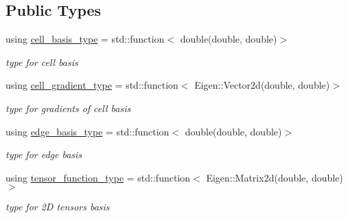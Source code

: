 \subsection*{Public Types}
\begin{DoxyCompactItemize}
\item 
\mbox{\label{classHCore2D_1_1HybridCore_a0111ea462b9a3b9859e1582b4bdaf63f}} 
using \hyperlink{classHCore2D_1_1HybridCore_a0111ea462b9a3b9859e1582b4bdaf63f}{cell\+\_\+basis\+\_\+type} = std\+::function$<$ double(double, double)$>$
\begin{DoxyCompactList}\small\item\em type for cell basis \end{DoxyCompactList}\item 
\mbox{\label{classHCore2D_1_1HybridCore_ae6a6ebafdb90354417d0068dd75134cd}} 
using \hyperlink{classHCore2D_1_1HybridCore_ae6a6ebafdb90354417d0068dd75134cd}{cell\+\_\+gradient\+\_\+type} = std\+::function$<$ Eigen\+::\+Vector2d(double, double)$>$
\begin{DoxyCompactList}\small\item\em type for gradients of cell basis \end{DoxyCompactList}\item 
\mbox{\label{classHCore2D_1_1HybridCore_ad3bb126480b53a54fa7eebbcbaa1dd4c}} 
using \hyperlink{classHCore2D_1_1HybridCore_ad3bb126480b53a54fa7eebbcbaa1dd4c}{edge\+\_\+basis\+\_\+type} = std\+::function$<$ double(double, double)$>$
\begin{DoxyCompactList}\small\item\em type for edge basis \end{DoxyCompactList}\item 
\mbox{\label{classHCore2D_1_1HybridCore_acf40d06e50a33dbb42cc4e1e3b0529b5}} 
using \hyperlink{classHCore2D_1_1HybridCore_acf40d06e50a33dbb42cc4e1e3b0529b5}{tensor\+\_\+function\+\_\+type} = std\+::function$<$ Eigen\+::\+Matrix2d(double, double)$>$
\begin{DoxyCompactList}\small\item\em type for 2D tensors basis \end{DoxyCompactList}\end{DoxyCompactItemize}
